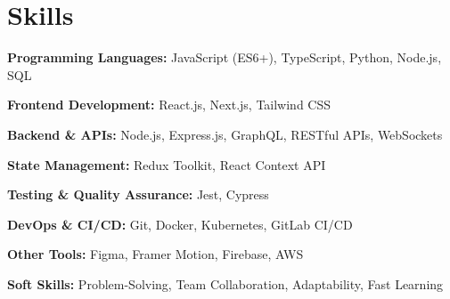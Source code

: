 \section{Skills}
\vspace{2pt}
\resumeSubHeadingListStart
\small{\item{

                \textbf{Programming Languages:}
                JavaScript (ES6+), TypeScript, Python, Node.js, SQL \\ \vspace{3pt}

                \textbf{Frontend Development:}
                React.js, Next.js, Tailwind CSS \\ \vspace{3pt}

                \textbf{Backend \& APIs:}
                Node.js, Express.js, GraphQL, RESTful APIs, WebSockets \\ \vspace{3pt}

                \textbf{State Management:}
                Redux Toolkit, React Context API \\ \vspace{3pt}

                \textbf{Testing \& Quality Assurance:}
                Jest, Cypress \\ \vspace{3pt}

                \textbf{DevOps \& CI/CD:}
                Git, Docker, Kubernetes, GitLab CI/CD \\ \vspace{3pt}

                \textbf{Other Tools:}
                Figma, Framer Motion, Firebase, AWS \\ \vspace{3pt}

                \textbf{Soft Skills:}
                Problem-Solving, Team Collaboration, Adaptability, Fast Learning
          }}
\resumeSubHeadingListEnd
